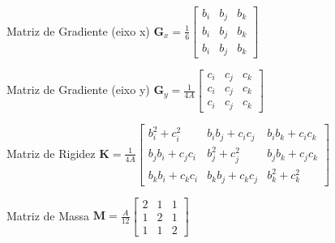 \documentclass{beamer}
\begin{document}
\begin{frame}
  \begin{minipage}[t]{.45\textwidth}
    \centering
    \begin{block}{Matriz de Gradiente (eixo x)}
      $\mathbf{G}_x = \frac{1}{6}
	\begin{bmatrix}
	  b_i & b_j & b_k \\
	  b_i & b_j & b_k \\
	  b_i & b_j & b_k
	\end{bmatrix}$
    \end{block}
  \end{minipage}
  \hfill
  \begin{minipage}[t]{.45\textwidth}
    \centering
    \begin{block}{Matriz de Gradiente (eixo y)}
      $\mathbf{G}_y = \frac{1}{4A}
	\begin{bmatrix}
	  c_i & c_j & c_k \\
	  c_i & c_j & c_k \\
	  c_i & c_j & c_k
	\end{bmatrix}$
    \end{block}
  \end{minipage}
  
  \begin{minipage}[t]{.63\textwidth}
    \centering
    \begin{block}{Matriz de Rigidez}
      \footnotesize
      $\mathbf{K} = \frac{1}{4A}
	\begin{bmatrix}
	  b_i^2 + c_i^2 & b_i b_j + c_i c_j & b_i b_k + c_i c_k \\
	  b_j b_i + c_j c_i & b_j^2 + c_j^2 & b_j b_k + c_j c_k \\
	  b_k b_i + c_k c_i & b_k b_j + c_k c_j & b_k^2 + c_k^2
	\end{bmatrix}$
    \end{block}
  \end{minipage}
  \hfill
  \begin{minipage}[t]{.33\textwidth}
    \centering
    \begin{block}{Matriz de Massa}
      $\mathbf{M} = \frac{A}{12}
	\begin{bmatrix}
	  2 & 1 & 1   \\
	  1 & 2 & 1   \\
	  1 & 1 & 2  
	\end{bmatrix}$
    \end{block}
  \end{minipage}
\end{frame}
\end{document}
